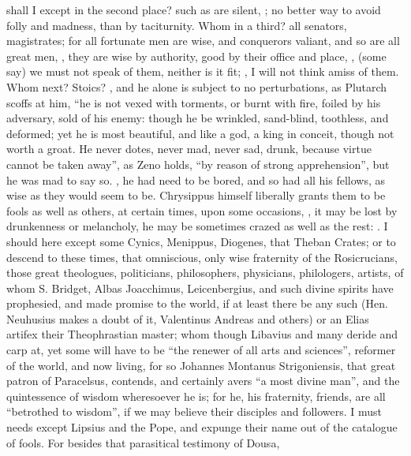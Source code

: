 shall I except in the second place? such as are silent, ; no better way to avoid folly and madness, than
by taciturnity. Whom in a third? all senators, magistrates; for all fortunate
men are wise, and conquerors valiant, and so are all great men, , they are wise by authority, good by their office and
place, , (some say) we must not speak of
them, neither is it fit; , I will not think
amiss of them. Whom next? Stoics? , and he alone is subject
to no perturbations, as Plutarch scoffs at him, \enquote{he is not
vexed with torments, or burnt with fire, foiled by his adversary, sold of his
enemy: though he be wrinkled, sand-blind, toothless, and deformed; yet he is
most beautiful, and like a god, a king in conceit, though not worth a groat. He
never dotes, never mad, never sad, drunk, because virtue cannot be taken away},
as Zeno holds, \enquote{by reason of strong apprehension}, but he
was mad to say so. , he had need to be bored, and so had all his fellows, as wise as they
would seem to be. Chrysippus himself liberally grants them to be fools as well
as others, at certain times, upon some occasions, , it may be lost by drunkenness or
melancholy, he may be sometimes crazed as well as the rest:
. I should
here except some Cynics, Menippus, Diogenes, that Theban Crates; or to descend
to these times, that omniscious, only wise fraternity of
the Rosicrucians, those great theologues, politicians, philosophers,
physicians, philologers, artists, \etc{} of whom S. Bridget, Albas Joacchimus,
Leicenbergius, and such divine spirits have prophesied, and made promise to the
world, if at least there be any such (Hen. Neuhusius makes
a doubt of it, Valentinus Andreas and others) or an Elias
artifex their Theophrastian master; whom though Libavius and many deride and
carp at, yet some will have to be \enquote{the renewer of all arts
and sciences}, reformer of the world, and now living, for so Johannes Montanus
Strigoniensis, that great patron of Paracelsus, contends, and certainly avers
\enquote{a most divine man}, and the quintessence of wisdom
wheresoever he is; for he, his fraternity, friends, \etc{} are all
\enquote{betrothed to wisdom}, if we may believe their disciples
and followers. I must needs except Lipsius and the Pope, and expunge their name
out of the catalogue of fools. For besides that parasitical testimony of Dousa,

